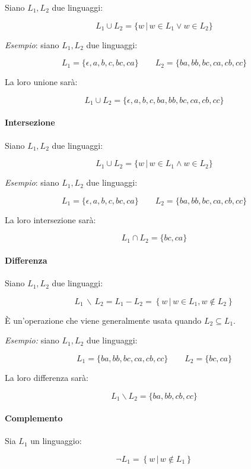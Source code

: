 \documentclass[italian, 10pt]{article}
\begin{document}
Siano \(L_1, L_2\) due linguaggi:

\[ L_1 \cup L_2 = \{w \, | \, w \in L_1 \lor w \in L_2 \} \]

\bigskip
\textit{Esempio}: siano \(L_1, L_2\) due linguaggi:

\[ L_1 = \{ \epsilon, a, b, c, bc, ca\} \qquad L_2 = \{ ba, bb, bc, ca, cb, cc\} \]

La loro unione sarà:

\[ L_1 \cup L_2 = \{\epsilon, a, b,c , ba, bb, bc, ca, cb, cc\} \]

\paragraph{Intersezione}

Siano \(L_1, L_2\) due linguaggi:

\[ L_1 \cup L_2 = \{w \, | \, w \in L_1 \land w \in L_2 \} \]

\bigskip
\textit{Esempio}: siano \(L_1, L_2\) due linguaggi:

\[ L_1 = \{ \epsilon, a, b, c, bc, ca\} \qquad L_2 = \{ ba, bb, bc, ca, cb, cc\} \]

La loro intersezione sarà:

\[ L_1 \cap L_2 = \{bc, ca\} \]

\paragraph{Differenza}

Siano \(L_1, L_2\) due linguaggi:

\[ L_1 \, \backslash \, L_2 = L_1 - L_2 = \left\{ w \, | \, w \in L_1, w \notin L_2 \right\} \]

È un'operazione che viene generalmente usata quando \(L_2 \subseteq L_1\).

\bigskip
\textit{Esempio:} siano \(L_1, L_2\) due linguaggi:

\[L_1 = \{ ba, bb, bc, ca, cb, cc\} \qquad L_2 = \{ bc, ca \} \]

La loro differenza sarà:

\[ L_1 \backslash L_2 = \{ba, bb, cb, cc\} \]

\paragraph{Complemento}

Sia \(L_1\) un linguaggio:

\[ \neg L_1 = \left\{ w \, | \, w \notin L_1 \right\} \]
\end{document}
